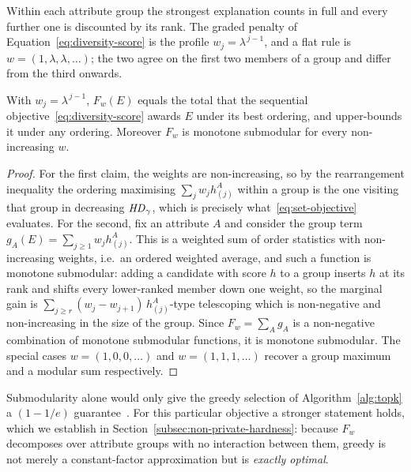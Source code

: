 Within each attribute group the strongest explanation counts in full and every further one is discounted by its rank.
The graded penalty of Equation~\eqref{eq:diversity-score} is the profile $w_j=\lambda^{\,j-1}$, and a flat rule is $w=(1,\lambda,\lambda,\dots)$; the two agree on the first two members of a group and differ from the third onwards.

\begin{proposition}
\label{prop:setobj}
With $w_j=\lambda^{\,j-1}$, $F_w(E)$ equals the total that the sequential objective~\eqref{eq:diversity-score} awards $E$ under its best ordering, and upper-bounds it under any ordering.
Moreover $F_w$ is monotone submodular for every non-increasing $w$.
\end{proposition}

\begin{proof}
For the first claim, the weights are non-increasing, so by the rearrangement inequality the ordering maximising $\sum_j w_j h^A_{(j)}$ within a group is the one visiting that group in decreasing $\mathit{HD}_\gamma$, which is precisely what~\eqref{eq:set-objective} evaluates.
For the second, fix an attribute $A$ and consider the group term
$g_A(E)=\sum_{j\ge1} w_j h^A_{(j)}$.
This is a weighted sum of order statistics with non-increasing weights, i.e.\ an ordered weighted average, and such a function is monotone submodular: adding a candidate with score $h$ to a group inserts $h$ at its rank and shifts every lower-ranked member down one weight, so the marginal gain is
$\sum_{j\ge r} (w_j-w_{j+1})\,h^A_{(j)}$-type telescoping which is non-negative and non-increasing in the size of the group.
Since $F_w=\sum_A g_A$ is a non-negative combination of monotone submodular functions, it is monotone submodular.
The special cases $w=(1,0,0,\dots)$ and $w=(1,1,1,\dots)$ recover a group maximum and a modular sum respectively.
\end{proof}

Submodularity alone would only give the greedy selection of Algorithm~\ref{alg:topk} a $(1-1/e)$ guarantee~\cite{NemhauserWF78}.
For this particular objective a stronger statement holds, which we establish in Section~\ref{subsec:non-private-hardness}: because $F_w$ decomposes over attribute groups with no interaction between them, greedy is not merely a constant-factor approximation but is \emph{exactly optimal}.

